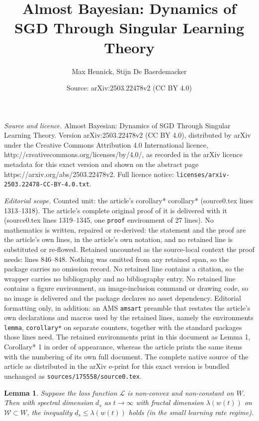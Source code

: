 \documentclass[10pt,a4paper]{amsart}
\title{Almost Bayesian: Dynamics of SGD Through Singular Learning Theory}
\author{Max Hennick, Stijn De Baerdemacker}
\date{Source: arXiv:2503.22478v2 (CC BY 4.0)}
\newtheorem{lemma}{Lemma}
\begin{document}
\maketitle

\noindent\emph{Source and licence.} Almost Bayesian: Dynamics of SGD Through Singular Learning Theory. Version arXiv:2503.22478v2 (CC BY 4.0), distributed by arXiv under the Creative Commons Attribution 4.0 International licence, http://creativecommons.org/licenses/by/4.0/, as recorded in the arXiv licence metadata for this exact version and shown on the abstract page https://arxiv.org/abs/2503.22478v2. Full licence notice: \texttt{licenses/arxiv-2503.22478-CC-BY-4.0.txt}.\par\smallskip

\noindent\textit{Editorial scope.} Counted unit: the article's corollary* corollary* (source0.tex lines 1313--1318). The article's complete original proof of it is delivered with it (source0.tex lines 1319--1345, one \texttt{proof} environment of 27 lines). No mathematics is written, repaired or re-derived: the statement and the proof are the article's own lines, in the article's own notation, and no retained line is substituted or re-flowed.  Retained uncounted as the source-local context the proof needs: lines 846--848.  Nothing was omitted from any retained span, so the package carries no omission record.  No retained line contains a citation, so the wrapper carries no bibliography and no bibliography entry.  No retained line contains a figure environment, an image-inclusion command or drawing code, so no image is delivered and the package declares no asset dependency.  Editorial formatting only, in addition: an AMS \texttt{amsart} preamble that restates the article's own declarations and macros used by the retained lines, namely the environments \texttt{lemma}, \texttt{corollary*} on separate counters, together with the standard packages those lines need.  The retained environments print in this document as Lemma 1, Corollary* 1 in order of appearance, whereas the article prints the same items with the numbering of its own full document.  The complete native source of the article as distributed in the arXiv e-print for this exact version is bundled unchanged as \texttt{sources/175558/source0.tex}.
\begin{lemma}\label{lem:spect_ineq}
Suppose the loss function $\mathcal{L}$ is non-convex and non-constant on $W$. Then with spectral dimension $d_s$ as $t \to \infty$ with fractal dimension $\lambda(w(t))$ on $\mathcal{W} \subset W$, the inequality $d_s \leq \lambda(w(t))$ holds (in the small learning rate regime).
\end{lemma}
\end{document}
